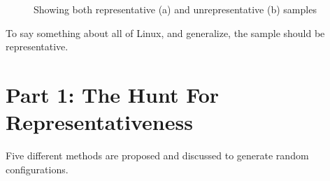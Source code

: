 \documentclass[a4paper,11pt]{report}
\newcommand{\figa}{
    \begin{figure}[!htpb]
    \centering
}
\newcommand{\figb}[2]{
    \caption{#1}
    \label{#2}
    \end{figure}
}
\begin{document}
\figa
\figb{Showing both representative (a) and unrepresentative (b) samples}{fig:reprrand}


To say something about all of Linux, and generalize, the sample should be representative.


        \section{Part 1: The Hunt For Representativeness}
        \label{rephunt}


Five different methods are proposed and discussed to generate random 
configurations.
\end{document}
